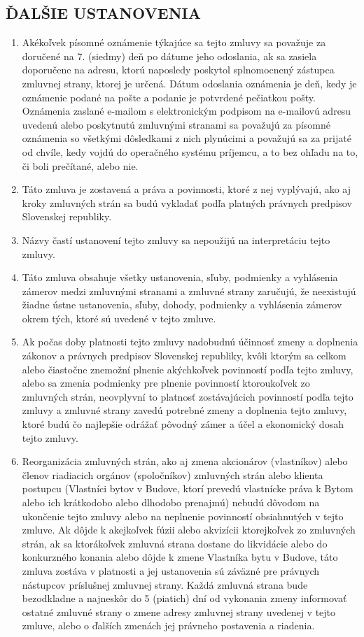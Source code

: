 \documentclass[a4paper]{article}
\begin{document}
\begin{multicols}{2}
\subsection{ĎALŠIE USTANOVENIA}
\begin{enumerate}
    \item Akékoľvek písomné oznámenie týkajúce sa tejto zmluvy sa považuje za doručené na 7. (siedmy) deň po dátume jeho odoslania, ak sa zasiela doporučene na adresu, ktorú naposledy poskytol splnomocnený zástupca zmluvnej strany, ktorej je určená. Dátum odoslania oznámenia je deň, kedy je oznámenie podané na pošte a podanie je potvrdené pečiatkou pošty. Oznámenia zaslané e-mailom s elektronickým podpisom na e-mailovú adresu uvedenú alebo poskytnutú zmluvnými stranami sa považujú za písomné oznámenia so všetkými dôsledkami z nich plynúcimi a považujú sa za prijaté od chvíle, kedy vojdú do operačného systému príjemcu, a to bez ohľadu na to, či boli prečítané, alebo nie.
    \item Táto zmluva je zostavená a práva a povinnosti, ktoré z nej vyplývajú, ako aj kroky zmluvných strán sa budú vykladať podľa platných právnych predpisov Slovenskej republiky.
    \item Názvy častí ustanovení tejto zmluvy sa nepoužijú na interpretáciu tejto zmluvy.
    \item Táto zmluva obsahuje všetky ustanovenia, sľuby, podmienky a vyhlásenia zámerov medzi zmluvnými stranami a zmluvné strany zaručujú, že neexistujú žiadne ústne ustanovenia, sľuby, dohody, podmienky a vyhlásenia zámerov okrem tých, ktoré sú uvedené v tejto zmluve. 
    \item Ak počas doby platnosti tejto zmluvy nadobudnú účinnosť zmeny a doplnenia zákonov a právnych predpisov Slovenskej republiky, kvôli ktorým sa celkom alebo čiastočne znemožní plnenie akýchkoľvek povinností podľa tejto zmluvy, alebo sa zmenia podmienky pre plnenie povinností ktoroukoľvek zo zmluvných strán, neovplyvní to platnosť zostávajúcich povinností podľa tejto zmluvy a zmluvné strany zavedú potrebné zmeny a doplnenia tejto zmluvy, ktoré budú čo najlepšie odrážať pôvodný zámer a účel a ekonomický dosah tejto zmluvy.  
    \item Reorganizácia zmluvných strán, ako aj zmena akcionárov (vlastníkov) alebo členov riadiacich orgánov (spoločníkov) zmluvných strán alebo klienta postupcu (Vlastníci bytov v Budove, ktorí prevedú vlastnícke práva k Bytom alebo ich krátkodobo alebo dlhodobo prenajmú) nebudú dôvodom na ukončenie tejto zmluvy alebo na neplnenie povinností obsiahnutých v tejto zmluve. Ak dôjde k akejkoľvek fúzii alebo akvizícii ktorejkoľvek zo zmluvných strán, ak sa ktorákoľvek zmluvná strana dostane do likvidácie alebo do konkurzného konania alebo dôjde k zmene Vlastníka bytu v Budove, táto zmluva zostáva v platnosti a jej ustanovenia sú záväzné pre právnych nástupcov príslušnej zmluvnej strany. Každá zmluvná strana bude bezodkladne a najneskôr do 5 (piatich) dní od vykonania zmeny informovať ostatné zmluvné strany o zmene adresy zmluvnej strany uvedenej v tejto zmluve, alebo o ďalších zmenách jej právneho postavenia a riadenia.

\end{enumerate}
\end{multicols}
\end{document}
